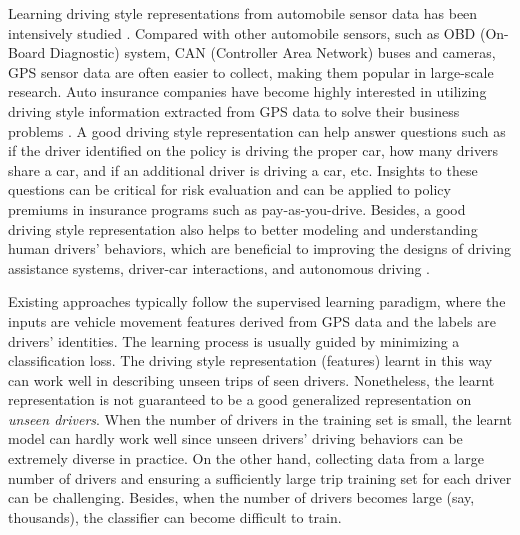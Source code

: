 \documentclass{article}
\begin{document}
Learning driving style representations from automobile sensor data %
has been intensively studied \cite{van2013driver,lin2014overview,kuderer2015learning,dong2016characterizing}. Compared with other automobile sensors, such as OBD (On-Board Diagnostic) system, CAN (Controller Area Network) buses and cameras, GPS sensor data are often easier to collect, %
making them popular in large-scale research.
Auto insurance companies have become highly interested in utilizing driving style information extracted from GPS data to solve their business problems \cite{laurie2011telematics}. %
A good driving style representation can help answer questions such as if the driver identified on the policy is driving the proper car, how many drivers share a car, and if an additional driver is driving a car, etc.
Insights to these questions can be critical for risk evaluation and can be applied to policy premiums in insurance programs such as pay-as-you-drive. %
Besides, a good driving style representation also helps to better modeling and understanding human drivers' behaviors, which are beneficial to improving the designs of driving assistance systems, driver-car interactions, and autonomous driving \cite{lin2014overview,kuderer2015learning}.

Existing approaches typically follow the supervised learning paradigm, where the inputs are vehicle movement features derived from GPS data and the labels are drivers' identities.
The learning process is usually guided by minimizing a classification loss.
The driving style representation (features) learnt in this way can work well in describing unseen trips of seen drivers. Nonetheless, %
the learnt representation is not guaranteed to be a good generalized representation on \emph{unseen drivers}.
When the number of drivers in the training set is small, the learnt model can hardly work well since unseen drivers' driving behaviors can be extremely diverse in practice.
On the other hand, collecting data from a large number of drivers and ensuring a sufficiently large trip training set for each driver can be challenging. Besides, when the number of drivers becomes large (say, thousands), the classifier can become difficult to train.
\end{document}
